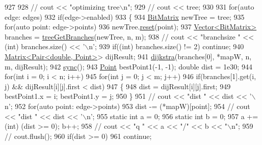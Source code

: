 \begin{DoxyCode}
927     
928     \textcolor{comment}{// cout << "optimizing tree\(\backslash\)n";}
929     \textcolor{comment}{// cout << tree;}
930     
931     \textcolor{keywordflow}{for}(\textcolor{keyword}{auto} edge: edges)
932         \textcolor{keywordflow}{if}(edge->enabled)
933         \{
934             \hyperlink{classBitMatrix}{BitMatrix} newTree = tree;
935             \textcolor{keywordflow}{for}(\textcolor{keyword}{auto} point: edge->points)
936                 newTree.\hyperlink{classBitMatrix_a0ee870454e6343c3272ab791e45af404}{reset}(point);
937             \hyperlink{classVector}{Vector<BitMatrix>} branches = \hyperlink{classColumnGenSolve_acbcc78e94e4a6e59ceb7da2357ddb87a}{treeGetBranches}(newTree, n, m);
938             \textcolor{comment}{// cout << "branchsize " << (int) branches.size() << '\(\backslash\)n';}
939             \textcolor{keywordflow}{if}((\textcolor{keywordtype}{int}) branches.size() != 2) \textcolor{keywordflow}{continue};
940             \hyperlink{classMatrix}{Matrix<Pair<double, Point>}> dijResult;
941             \hyperlink{classColumnGenSolve_a71007959556061091171c03da6197f34}{dijkstra}(branches[0], *mapW, n, m, dijResult);
942             \hyperlink{classColumnGenSolve_ab976cab8582808218110d86252177f88}{sync}();
943             \hyperlink{classPoint}{Point} bestPoint1(-1, -1); \textcolor{keywordtype}{double} dist = 1e30;
944             \textcolor{keywordflow}{for}(\textcolor{keywordtype}{int} i = 0; i < n; i++)
945                 \textcolor{keywordflow}{for}(\textcolor{keywordtype}{int} j = 0; j < m; j++)
946                     \textcolor{keywordflow}{if}(branches[1].\textcolor{keyword}{get}(i, j) && dijResult[i][j].first < dist)
947                     \{
948                         dist = dijResult[i][j].first;
949                         bestPoint1.x = i; bestPoint1.y = j;
950                     \}
951             \textcolor{comment}{// cout << "dist " << dist << '\(\backslash\)n';}
952             \textcolor{keywordflow}{for}(\textcolor{keyword}{auto} point: edge->points)
953                 dist -= (*mapW)[point];
954             \textcolor{comment}{// cout << "dist " << dist << '\(\backslash\)n';}
955             \textcolor{keyword}{static} \textcolor{keywordtype}{int} a = 0;
956             \textcolor{keyword}{static} \textcolor{keywordtype}{int} b = 0;
957             a += (int) (dist >= 0); b++;
958             \textcolor{comment}{// cout << "q " << a << "/" << b << "\(\backslash\)n";}
959             \textcolor{comment}{// cout.flush();}
960             \textcolor{keywordflow}{if}(dist >= 0)
961                 \textcolor{keywordflow}{continue};

\end{DoxyCode}
